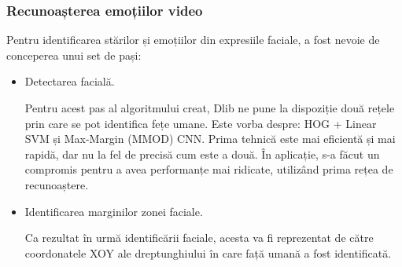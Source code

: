 \documentclass[a4paper, 12pt]{report}
\begin{document}
	\clearpage
	\subsubsection{Recunoașterea emoțiilor video}
	Pentru identificarea stărilor și emoțiilor din expresiile faciale, a fost nevoie de conceperea unui set de pași:
	\begin{itemize}
		\item Detectarea facială.
				
		Pentru acest pas al algoritmului creat, Dlib ne pune la dispoziție două rețele prin care se pot identifica fețe umane. Este vorba despre: HOG + Linear SVM și Max-Margin (MMOD) CNN. Prima tehnică este mai eficientă și mai rapidă, dar nu la fel de precisă cum este a două. În aplicație, s-a făcut un compromis pentru a avea performanțe mai ridicate, utilizând prima rețea de recunoaștere. 
		
		\item Identificarea marginilor zonei faciale.
		
		Ca rezultat în urmă identificării faciale, acesta va fi reprezentat de către coordonatele XOY ale dreptunghiului în care față umană a fost identificată.
		

\end{itemize}
\end{document}
